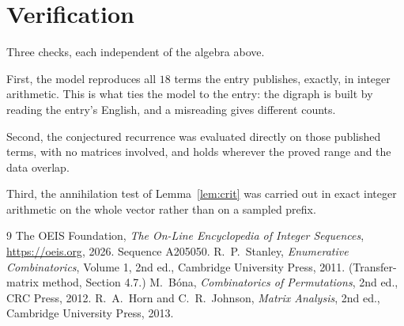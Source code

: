 \documentclass[11pt,a4paper]{article}
\theoremstyle{plain}
\theoremstyle{definition}
\begin{document}
\section{Verification}

Three checks, each independent of the algebra above.

First, the model reproduces all $18$ terms the entry publishes, exactly, in integer
arithmetic. This is what ties the model to the entry: the digraph is built by reading the
entry's English, and a misreading gives different counts.

Second, the conjectured recurrence was evaluated directly on those published terms, with no
matrices involved, and holds wherever the proved range and the data overlap.

Third, the annihilation test of Lemma~\ref{lem:crit} was carried out in exact integer
arithmetic on the whole vector rather than on a sampled prefix.

\begin{thebibliography}{9}
 The OEIS Foundation, \emph{The On-Line Encyclopedia of Integer
Sequences}, \url{https://oeis.org}, 2026. Sequence A205050.
 R.~P.~Stanley, \emph{Enumerative Combinatorics}, Volume 1, 2nd ed.,
Cambridge University Press, 2011. (Transfer-matrix method, Section 4.7.)
 M.~B\'ona, \emph{Combinatorics of Permutations}, 2nd ed., CRC
Press, 2012.
 R.~A.~Horn and C.~R.~Johnson, \emph{Matrix Analysis}, 2nd ed., Cambridge
University Press, 2013.
\end{thebibliography}
\end{document}
